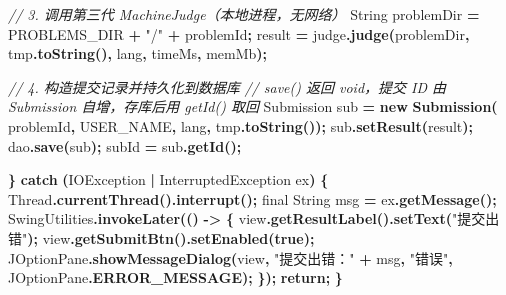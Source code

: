 \documentclass[
  11pt,
]{ctexart}
\newenvironment{Shaded}{\begin{snugshade}}{\end{snugshade}}
\newcommand{\BuiltInTok}[1]{#1}
\newcommand{\CommentTok}[1]{\textcolor[rgb]{0.56,0.35,0.01}{\textit{#1}}}
\newcommand{\ControlFlowTok}[1]{\textcolor[rgb]{0.13,0.29,0.53}{\textbf{#1}}}
\newcommand{\DataTypeTok}[1]{\textcolor[rgb]{0.13,0.29,0.53}{#1}}
\newcommand{\FunctionTok}[1]{\textcolor[rgb]{0.13,0.29,0.53}{\textbf{#1}}}
\newcommand{\KeywordTok}[1]{\textcolor[rgb]{0.13,0.29,0.53}{\textbf{#1}}}
\newcommand{\NormalTok}[1]{#1}
\newcommand{\OperatorTok}[1]{\textcolor[rgb]{0.81,0.36,0.00}{\textbf{#1}}}
\newcommand{\StringTok}[1]{\textcolor[rgb]{0.31,0.60,0.02}{#1}}
\begin{document}
\begin{Shaded}
\begin{Highlighting}[]
                \CommentTok{// 3. 调用第三代 MachineJudge（本地进程，无网络）}
                \BuiltInTok{String}\NormalTok{ problemDir }\OperatorTok{=}\NormalTok{ PROBLEMS\_DIR }\OperatorTok{+} \StringTok{"/"} \OperatorTok{+}\NormalTok{ problemId}\OperatorTok{;}
\NormalTok{                result }\OperatorTok{=}\NormalTok{ judge}\OperatorTok{.}\FunctionTok{judge}\OperatorTok{(}\NormalTok{problemDir}\OperatorTok{,}\NormalTok{ tmp}\OperatorTok{.}\FunctionTok{toString}\OperatorTok{(),}
\NormalTok{                    lang}\OperatorTok{,}\NormalTok{ timeMs}\OperatorTok{,}\NormalTok{ memMb}\OperatorTok{);}

                \CommentTok{// 4. 构造提交记录并持久化到数据库}
                \CommentTok{//    save() 返回 void，提交 ID 由 Submission 自增，存库后用 getId() 取回}
\NormalTok{                Submission sub }\OperatorTok{=} \KeywordTok{new} \FunctionTok{Submission}\OperatorTok{(}
\NormalTok{                    problemId}\OperatorTok{,}\NormalTok{ USER\_NAME}\OperatorTok{,}\NormalTok{ lang}\OperatorTok{,}\NormalTok{ tmp}\OperatorTok{.}\FunctionTok{toString}\OperatorTok{());}
\NormalTok{                sub}\OperatorTok{.}\FunctionTok{setResult}\OperatorTok{(}\NormalTok{result}\OperatorTok{);}
\NormalTok{                dao}\OperatorTok{.}\FunctionTok{save}\OperatorTok{(}\NormalTok{sub}\OperatorTok{);}
\NormalTok{                subId }\OperatorTok{=}\NormalTok{ sub}\OperatorTok{.}\FunctionTok{getId}\OperatorTok{();}

            \OperatorTok{\}} \ControlFlowTok{catch} \OperatorTok{(}\BuiltInTok{IOException} \OperatorTok{|} \BuiltInTok{InterruptedException}\NormalTok{ ex}\OperatorTok{)} \OperatorTok{\{}
                \BuiltInTok{Thread}\OperatorTok{.}\FunctionTok{currentThread}\OperatorTok{().}\FunctionTok{interrupt}\OperatorTok{();}
                \DataTypeTok{final} \BuiltInTok{String}\NormalTok{ msg }\OperatorTok{=}\NormalTok{ ex}\OperatorTok{.}\FunctionTok{getMessage}\OperatorTok{();}
                \BuiltInTok{SwingUtilities}\OperatorTok{.}\FunctionTok{invokeLater}\OperatorTok{(()} \OperatorTok{{-}\textgreater{}} \OperatorTok{\{}
\NormalTok{                    view}\OperatorTok{.}\FunctionTok{getResultLabel}\OperatorTok{().}\FunctionTok{setText}\OperatorTok{(}\StringTok{"提交出错"}\OperatorTok{);}
\NormalTok{                    view}\OperatorTok{.}\FunctionTok{getSubmitBtn}\OperatorTok{().}\FunctionTok{setEnabled}\OperatorTok{(}\KeywordTok{true}\OperatorTok{);}
                    \BuiltInTok{JOptionPane}\OperatorTok{.}\FunctionTok{showMessageDialog}\OperatorTok{(}\NormalTok{view}\OperatorTok{,}
                        \StringTok{"提交出错："} \OperatorTok{+}\NormalTok{ msg}\OperatorTok{,} \StringTok{"错误"}\OperatorTok{,}
                        \BuiltInTok{JOptionPane}\OperatorTok{.}\FunctionTok{ERROR\_MESSAGE}\OperatorTok{);}
                \OperatorTok{\});}
                \ControlFlowTok{return}\OperatorTok{;}
            \OperatorTok{\}}


\end{Highlighting}
\end{Shaded}
\end{document}
